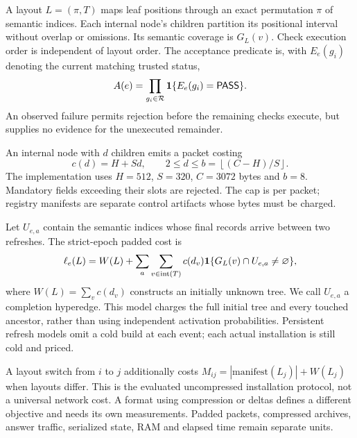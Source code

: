 \documentclass[preprint,12pt]{elsarticle}
\theoremstyle{definition}\newtheorem{definition}[theorem]{Definition}
\newcommand{\PASS}{\mathsf{PASS}}\newcommand{\FAIL}{\mathsf{FAIL}}\newcommand{\UNKNOWN}{\mathsf{UNKNOWN}}
\begin{document}
A layout $L=(\pi,T)$ maps leaf positions through an exact permutation $\pi$
of semantic indices. Each internal node's children partition its positional
interval without overlap or omissions. Its semantic coverage is $G_L(v)$.
Check execution order is independent of layout order. The acceptance
predicate is, with $E_e(g_i)$ denoting the current matching trusted status,
\begin{equation}\label{eq:accept}
 A(e)=\prod_{g_i\in\mathcal R}\ind\{E_e(g_i)=\PASS\}.
\end{equation}
An observed failure permits rejection before the remaining checks execute,
but supplies no evidence for the unexecuted remainder.

An internal node with $d$ children emits a packet costing
\begin{equation}\label{eq:packet}
 c(d)=H+Sd,\qquad 2\le d\le
 b=\left\lfloor(C-H)/S\right\rfloor.
\end{equation}
The implementation uses $H=512$, $S=320$, $C=3072$ bytes and $b=8$.
Mandatory fields exceeding their slots are rejected. The cap is per packet;
registry manifests are separate control artifacts whose bytes must be charged.

Let $U_{e,a}$ contain the semantic indices whose final records arrive
between two refreshes. The strict-epoch padded cost is
\begin{equation}\label{eq:jcost}
 \ell_e(L)=W(L)+\sum_a\sum_{v\in\operatorname{int}(T)}
 c(d_v)\mathbf 1\{G_L(v)\cap U_{e,a}\ne\varnothing\},
\end{equation}
where $W(L)=\sum_vc(d_v)$ constructs an initially unknown tree.
We call $U_{e,a}$ a completion hyperedge. This model charges the full initial
tree and every touched ancestor, rather than using independent activation
probabilities. Persistent refresh models omit a cold build at each event;
each actual installation is still cold and priced.

A layout switch from $i$ to $j$ additionally costs
$M_{ij}=|\mathrm{manifest}(L_j)|+W(L_j)$ when layouts differ.
This is the evaluated uncompressed installation protocol, not a universal
network cost. A format using compression or deltas defines a different
objective and needs its own measurements. Padded packets, compressed
archives, answer traffic, serialized state, RAM and elapsed time remain
separate units.
\end{document}
